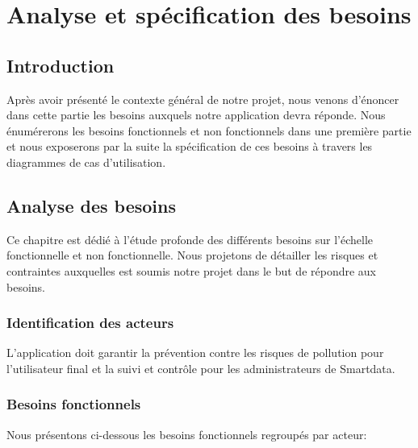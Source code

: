 \chapter{Analyse et spécification des besoins}

\section*{Introduction}

\qquad Après avoir présenté le contexte général de notre projet, nous venons d’énoncer dans cette partie les besoins auxquels notre application devra réponde. Nous énumérerons les besoins fonctionnels et non fonctionnels dans une première partie et nous exposerons par la suite la spécification de ces besoins à travers les diagrammes de cas d’utilisation.

\section{Analyse des besoins}

\qquad Ce chapitre est dédié à l'étude profonde des différents besoins sur l'échelle fonctionnelle et non fonctionnelle. Nous projetons de détailler les risques et contraintes auxquelles est soumis notre projet dans le but de répondre aux besoins.

\subsection{Identification des acteurs}

\qquad L'application doit garantir la prévention contre les risques de pollution pour l'utilisateur final et la suivi et contrôle pour les administrateurs de Smartdata.

\subsection{Besoins fonctionnels}
\qquad Nous présentons ci-dessous les besoins fonctionnels regroupés par acteur:

